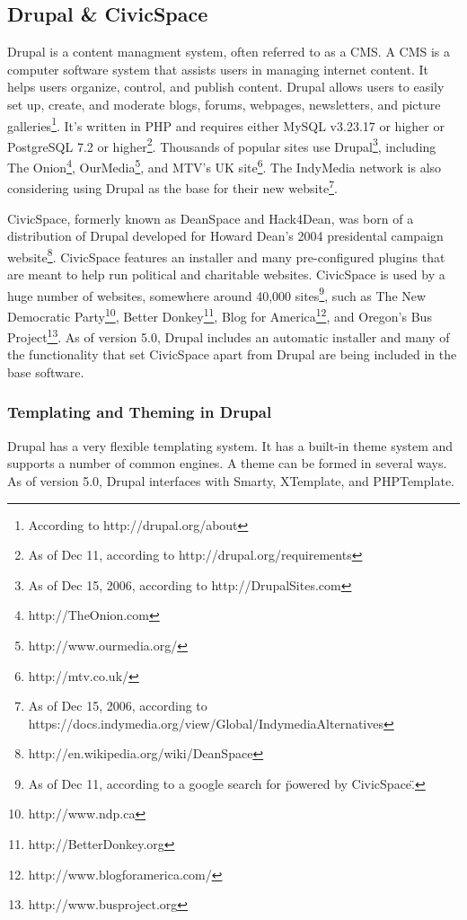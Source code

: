 \documentclass[a4paper,12pt]{report}
\begin{document}
\subsection {Drupal \& CivicSpace}
Drupal is a content managment system, often referred to as a CMS. 
A CMS is a computer software system that assists users in managing internet content.
It helps users organize, control, and publish content.
Drupal allows users to easily set up, create, and moderate blogs, forums, webpages, newsletters, and picture galleries\footnote{According to  http://drupal.org/about}.
It's written in PHP and requires either MySQL v3.23.17 or higher or PostgreSQL 7.2 or higher\footnote{As of Dec 11, according to http://drupal.org/requirements}.
Thousands of popular sites use Drupal\footnote{As of Dec 15, 2006, according to http://DrupalSites.com}, including The Onion\footnote{ http://TheOnion.com}, OurMedia\footnote{http://www.ourmedia.org/}, and MTV's UK site\footnote{http://mtv.co.uk/}.
The IndyMedia network is also considering using Drupal as the base for their new website\footnote{As of Dec 15, 2006, according to https://docs.indymedia.org/view/Global/IndymediaAlternatives}.


CivicSpace, formerly known as DeanSpace and Hack4Dean, was born of a distribution of Drupal developed for Howard Dean's 2004 presidental campaign website\footnote{ http://en.wikipedia.org/wiki/DeanSpace}.
CivicSpace features an installer and many pre-configured plugins that are meant to help run political and charitable websites.
CivicSpace is used by a huge number of websites, somewhere around 40,000 sites\footnote{As of Dec 11, according to a google search for \"powered by CivicSpace\".}, such as The New Democratic Party\footnote{ http://www.ndp.ca}, Better Donkey\footnote{http://BetterDonkey.org}, Blog for America\footnote{ http://www.blogforamerica.com/}, and Oregon's Bus Project\footnote{http://www.busproject.org}.
As of version 5.0, Drupal includes an automatic installer and many of the functionality that set CivicSpace apart from Drupal are being included in the base software.


\subsubsection {Templating and Theming in Drupal}
Drupal has a very flexible templating system. 
It has a built-in theme system and supports a number of common engines. 
A theme can be formed in several ways. 
As of version 5.0, Drupal interfaces with Smarty, XTemplate, and PHPTemplate. 
\end{document}
